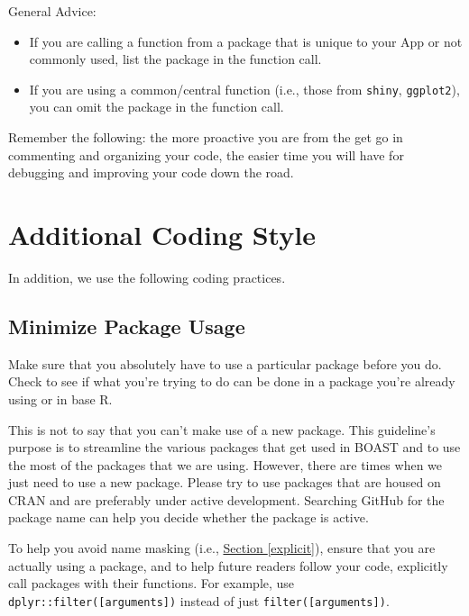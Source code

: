 \documentclass[
]{book}
\providecommand{\tightlist}{%
  \setlength{\itemsep}{0pt}\setlength{\parskip}{0pt}}
\begin{document}
General Advice:

\begin{itemize}
\tightlist
\item
  If you are calling a function from a package that is unique to your App or not commonly used, list the package in the function call.
\item
  If you are using a common/central function (i.e., those from \texttt{shiny}, \texttt{ggplot2}), you can omit the package in the function call.
\end{itemize}

Remember the following: the more proactive you are from the get go in commenting and organizing your code, the easier time you will have for debugging and improving your code down the road.

\hypertarget{additional-coding-style-2}{%
\section{Additional Coding Style}\label{additional-coding-style-2}}

In addition, we use the following coding practices.

\hypertarget{minPackagesc}{%
\subsection{Minimize Package Usage}\label{minPackagesc}}

Make sure that you absolutely have to use a particular package before you do. Check to see if what you're trying to do can be done in a package you're already using or in base R.

This is not to say that you can't make use of a new package. This guideline's purpose is to streamline the various packages that get used in BOAST and to use the most of the packages that we are using. However, there are times when we just need to use a new package. Please try to use packages that are housed on CRAN and are preferably under active development. Searching GitHub for the package name can help you decide whether the package is active.

To help you avoid name masking (i.e., \protect\hyperlink{explicitc}{Section \ref{explicit}}), ensure that you are actually using a package, and to help future readers follow your code, explicitly call packages with their functions. For example, use \texttt{dplyr::filter({[}arguments{]})} instead of just \texttt{filter({[}arguments{]})}.
\end{document}
